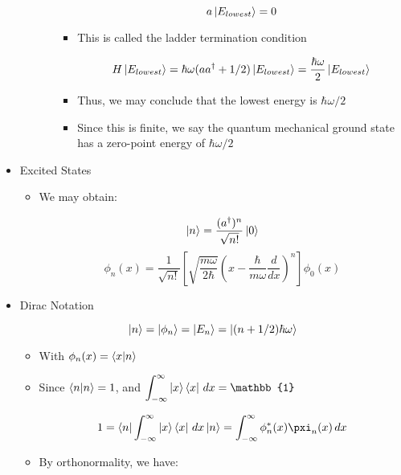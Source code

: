 \begin{itemize}
\begin{itemize}
\begin{itemize}
\begin{itemize}
                $$a\ket{E_{lowest}}=0$$

              \item This is called the ladder termination condition

                $$H\ket{E_{lowest}}=\hbar\omega(aa^{\dagger}+1/2)\ket{E_{lowest}}=\frac{\hbar\omega}{2}\ket{E_{lowest}}$$

              \item Thus, we may conclude that the lowest energy is $\hbar\omega/2$

              \item Since this is finite, we say the quantum mechanical ground state has a zero-point energy of $\hbar\omega/2$

            \end{itemize}

        \end{itemize}

    \end{itemize}

  \item Excited States

    \begin{itemize}

      \item We may obtain:
        
        $$\ket{n}=\frac{(a^{\dagger})^n}{\sqrt{n!}}\ket{0}$$
        $$\phi_n(x)=\frac{1}{\sqrt{n!}}\left[ \sqrt{\frac{m\omega}{2\hbar}}\left( x-\frac{\hbar}{m\omega}\frac{d}{dx} \right)^n \right]\phi_0(x)$$

    \end{itemize}

  \item Dirac Notation

    $$\ket{n}=\ket{\phi_n}=\ket{E_n}=\ket{(n+1/2)\hbar\omega}$$

    \begin{itemize}

      \item With $\phi_n(x)=\bra{x}\ket{n}$

      \item Since $\braket{n}=1$, and $\displaystyle \int_{-\infty}^{\infty} \ket{x}\bra{x}\,dx=\mathbb{1}$

        $$1=\bra{n}\int_{-\infty}^{\infty}\ket{x}\bra{x}\,dx\ket{n}=\int_{-\infty}^{\infty} \phi_n^*(x)\pxi_n(x)\,dx$$

      \item By orthonormality, we have:


\end{itemize}
\end{itemize}
